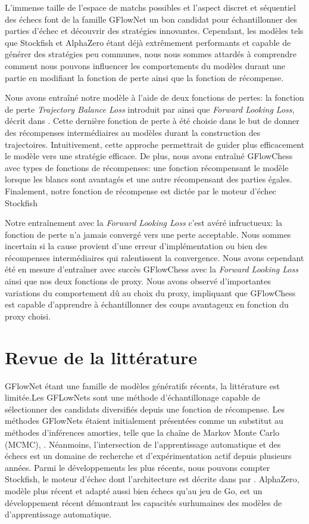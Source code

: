 \documentclass[11pt]{article}
\begin{document}
L'immense taille de l'espace de matchs possibles et l'aspect discret
et séquentiel des échecs font de la famille GFlowNet un bon candidat
pour échantillonner des parties d'échec et découvrir des stratégies
innovantes. Cependant, les modèles tels que Stockfish et AlphaZero
étant déjà extrêmement performants et capable de générer des
stratégies peu communes, nous nous sommes attardés à comprendre
comment nous pouvons influencer les comportements du modèles durant
une partie en modifiant la fonction de perte ainsi que la fonction de
récompense.

Nous avons entraîné notre modèle à l'aide de deux fonctions de pertes:
la fonction de perte \textit{Trajectory Balance Loss} introduit par
\citet{TBLoss} ainsi que \textit{Forward Looking Loss}, décrit dans
\citet{FLLoss}. Cette dernière fonction de perte à été choisie dans le
but de donner des récompenses intermédiaires au modèles durant la
construction des trajectoires. Intuitivement, cette approche
permettrait de guider plus efficacement le modèle vers une stratégie
efficace. De plus, nous avons entraîné GFlowChess avec types de
fonctions de récompenses: une fonction récompensant le modèle lorsque
les blancs sont avantagés et une autre récompensant des parties
égales. Finalement, notre fonction de récompense est dictée par le
moteur d'échec Stockfish

Notre entraînement avec la \textit{Forward Looking Loss} c'est avéré
infructueux: la fonction de perte n'a jamais convergé vers une perte
acceptable. Nous sommes incertain si la cause provient d'une erreur
d'implémentation ou bien des récompenses intermédiaires qui
ralentissent la convergence. Nous avons cependant été en mesure
d'entraîner avec succès GFlowChess avec la \textit{Forward Looking
  Loss} ainsi que nos deux fonctions de proxy. Nous avons observé
d'importantes variations du comportement dû au choix du proxy,
impliquant que GFlowChess est capable d'apprendre à échantillonner des
coups avantageux en fonction du proxy choisi.

\section*{Revue de la littérature}
GFlowNet étant une famille de modèles génératifs récents, la
littérature est limitée.Les GFLowNets sont une méthode
d’échantillonage capable de sélectionner des candidats diversifiés
depuis une fonction de récompense. Les méthodes GFlowNets étaient
initialement présentées comme un substitut au méthodes d’inférences
amorties, telle que la chaîne de Markov Monte Carlo (MCMC),
\cite{gflownetfoundation}. Néanmoins, l'intersection de
l'apprentissage automatique et des échecs est un domaine de recherche
et d'expérimentation actif depuis plusieurs années. Parmi le
développements les plus récents, nous pouvons compter Stockfish, le
moteur d'échec dont l'architecture est décrite dans par
\citet{stockfish}. AlphaZero, modèle plus récent et adapté aussi bien
échecs qu'au jeu de Go, est un développement récent démontrant les
capacités surhumaines des modèles de d'apprentissage automatique.
\end{document}
